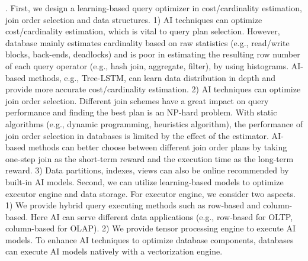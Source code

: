 . 
First, we design a learning-based query optimizer in cost/cardinality estimation, join order selection and data structures. 1) AI techniques can optimize cost/cardinality estimation, which is vital to query plan selection. However, database mainly estimates cardinality based on raw statistics (e.g., read/write blocks, back-ends, deadlocks) and is poor in estimating the resulting row number of each query operator (e.g., hash join, aggregate, filter), by using histograms. AI-based methods, e.g., Tree-LSTM, can learn data distribution in depth and provide more accurate cost/cardinality estimation. 2) AI techniques can optimize join order selection. Different join schemes have a great impact on query performance and finding the best plan is an NP-hard problem. With static algorithms (e.g., dynamic programming, heuristics algorithm), the performance of join order selection in databases is limited by the effect of the estimator. AI-based methods can better choose between different join order plans by taking one-step join as the short-term reward and the execution time as the long-term reward. 3) Data partitions, indexes, views can also be online recommended by built-in AI models.  
Second, we can utilize learning-based models to optimize executor engine and  data storage. For executor engine, we consider two aspects. 1) We provide hybrid query executing methods such as row-based and column-based. Here AI can serve different data applications (e.g., row-based for OLTP, column-based for OLAP). 2) We provide tensor processing engine to execute AI models. To enhance AI techniques to optimize database components, databases can execute AI models natively with a vectorization engine. %




